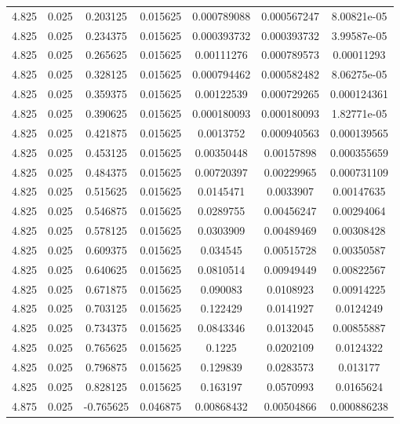 \begin{table}[bh]
\begin{center}
{\begin{tabular}{ccccccc}
4.825	 & 0.025 & 	0.203125	 & 0.015625	 & 0.000789088	 & 0.000567247	 & 8.00821e-05 \\ 
4.825	 & 0.025 & 	0.234375	 & 0.015625	 & 0.000393732	 & 0.000393732	 & 3.99587e-05 \\ 
4.825	 & 0.025 & 	0.265625	 & 0.015625	 & 0.00111276	 & 0.000789573	 & 0.00011293 \\ 
4.825	 & 0.025 & 	0.328125	 & 0.015625	 & 0.000794462	 & 0.000582482	 & 8.06275e-05 \\ 
4.825	 & 0.025 & 	0.359375	 & 0.015625	 & 0.00122539	 & 0.000729265	 & 0.000124361 \\ 
4.825	 & 0.025 & 	0.390625	 & 0.015625	 & 0.000180093	 & 0.000180093	 & 1.82771e-05 \\ 
4.825	 & 0.025 & 	0.421875	 & 0.015625	 & 0.0013752	 & 0.000940563	 & 0.000139565 \\ 
4.825	 & 0.025 & 	0.453125	 & 0.015625	 & 0.00350448	 & 0.00157898	 & 0.000355659 \\ 
4.825	 & 0.025 & 	0.484375	 & 0.015625	 & 0.00720397	 & 0.00229965	 & 0.000731109 \\ 
4.825	 & 0.025 & 	0.515625	 & 0.015625	 & 0.0145471	 & 0.0033907	 & 0.00147635 \\ 
4.825	 & 0.025 & 	0.546875	 & 0.015625	 & 0.0289755	 & 0.00456247	 & 0.00294064 \\ 
4.825	 & 0.025 & 	0.578125	 & 0.015625	 & 0.0303909	 & 0.00489469	 & 0.00308428 \\ 
4.825	 & 0.025 & 	0.609375	 & 0.015625	 & 0.034545	 & 0.00515728	 & 0.00350587 \\ 
4.825	 & 0.025 & 	0.640625	 & 0.015625	 & 0.0810514	 & 0.00949449	 & 0.00822567 \\ 
4.825	 & 0.025 & 	0.671875	 & 0.015625	 & 0.090083	 & 0.0108923	 & 0.00914225 \\ 
4.825	 & 0.025 & 	0.703125	 & 0.015625	 & 0.122429	 & 0.0141927	 & 0.0124249 \\ 
4.825	 & 0.025 & 	0.734375	 & 0.015625	 & 0.0843346	 & 0.0132045	 & 0.00855887 \\ 
4.825	 & 0.025 & 	0.765625	 & 0.015625	 & 0.1225	 & 0.0202109	 & 0.0124322 \\ 
4.825	 & 0.025 & 	0.796875	 & 0.015625	 & 0.129839	 & 0.0283573	 & 0.013177 \\ 
4.825	 & 0.025 & 	0.828125	 & 0.015625	 & 0.163197	 & 0.0570993	 & 0.0165624 \\ 
4.875	 & 0.025 & 	-0.765625	 & 0.046875	 & 0.00868432	 & 0.00504866	 & 0.000886238 \\ 

\end{tabular}}
\end{center}
\end{table}
